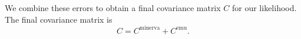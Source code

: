 \documentclass[12pt]{article}
\newcommand{\cov}[1]{C^\text{#1}}
\newcommand{\covtot}{C}
\newcommand{\y}[1]{y_{\text{#1}}}
\begin{document}

We combine these errors to obtain a final covariance matrix $\covtot$ for our likelihood.
The final covariance matrix is
\begin{equation}
    \covtot = \cov{minerva} + \cov{emu}.
\end{equation}

\end{document}

